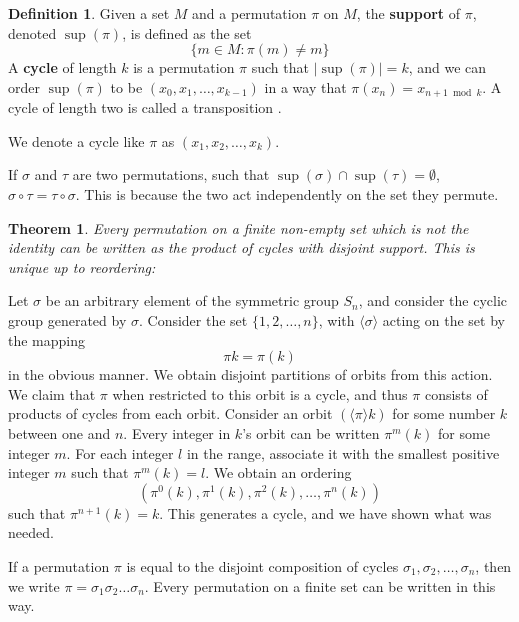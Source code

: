 \documentclass[12pt]{amsbook}
\makeatletter
\theoremstyle{plain}
\newtheorem{theorem}{Theorem}[chapter]
\theoremstyle{definition}
\newtheorem{definition}{Definition}
\renewenvironment{proof}[1][\proofname]{\par
  \pushQED{\qed}%
  \normalfont \topsep6\p@\@plus6\p@\relax
  \list{}{\leftmargin=0em
          \rightmargin=\leftmargin
          \settowidth{\itemindent}{\itshape#1}%
          \labelwidth=\itemindent}

  \item[\hskip\labelsep
        \itshape
    #1\@addpunct{.}]\ignorespaces
}{%
  \popQED\endlist\@endpefalse
}
\makeatother
\begin{document}
\begin{definition}
    Given a set $M$ and a permutation $\pi$ on $M$, the {\bf support}  of $\pi$, denoted $\sup(\pi)$, is defined as the set
    \[ \{ m \in M : \pi(m) \neq m \} \]
    A {\bf cycle}  of length $k$ is a permutation $\pi$ such that $|\sup(\pi)| = k$, and we can order $\sup(\pi)$ to be $(x_0, x_1, \dots, x_{k-1})$ in a way that $\pi(x_n) = x_{n+1 \bmod k}$. A cycle of length two is called a transposition .
\end{definition}

We denote a cycle like $\pi$ as $(x_1, x_2, \dots, x_k)$.

If $\sigma$ and $\tau$ are two permutations, such that $\sup(\sigma) \cap \sup(\tau) = \emptyset$, $\sigma \circ \tau = \tau \circ \sigma$. This is because the two act independently on the set they permute.

\begin{theorem}
Every permutation on a finite non-empty set which is not the identity can be written as the product of cycles with disjoint support. This is unique up to reordering:
\end{theorem}
\begin{proof}
    Let $\sigma$ be an arbitrary element of the symmetric group $S_n$, and consider the cyclic group generated by $\sigma$. Consider the set $\{ 1, 2, \dots, n \}$, with $\langle \sigma \rangle$ acting on the set by the mapping
    \[ \pi k = \pi(k) \]
    in the obvious manner. We obtain disjoint partitions of orbits from this action. We claim that $\pi$ when restricted to this orbit is a cycle, and thus $\pi$ consists of products of cycles from each orbit. Consider an orbit $(\langle \pi \rangle k)$ for some number $k$ between one and $n$. Every integer in $k$'s orbit can be written $\pi^m(k)$ for some integer $m$. For each integer $l$ in the range, associate it with the smallest positive integer $m$ such that $\pi^m(k) = l$. We obtain an ordering
    \[ (\pi^0(k), \pi^1(k), \pi^2(k), \dots, \pi^n(k)) \]
    such that $\pi^{n+1}(k) = k$. This generates a cycle, and we have shown what was needed.
\end{proof}

If a permutation $\pi$ is equal to the disjoint composition of cycles $\sigma_1, \sigma_2, \dots, \sigma_n$, then we write $\pi = \sigma_1\sigma_2\dots\sigma_n$. Every permutation on a finite set can be written in this way.
\end{document}
